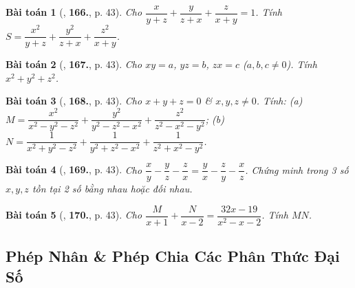 \documentclass{article}
\numberwithin{equation}{section}
\newtheorem{baitoan}{Bài toán}
\begin{document}
\begin{baitoan}[\cite{Tuyen_Toan_8}, \textbf{166.}, p. 43]
	Cho $\dfrac{x}{y + z} + \dfrac{y}{z + x} + \dfrac{z}{x + y} = 1$. Tính $S = \dfrac{x^2}{y + z} + \dfrac{y^2}{z + x} + \dfrac{z^2}{x + y}$.
\end{baitoan}

\begin{baitoan}[\cite{Tuyen_Toan_8}, \textbf{167.}, p. 43]
	Cho $xy = a$, $yz = b$, $zx = c$ ($a,b,c\ne0$). Tính $x^2 + y^2 + z^2$.
\end{baitoan}

\begin{baitoan}[\cite{Tuyen_Toan_8}, \textbf{168.}, p. 43]
	Cho $x + y + z = 0$ \& $x,y,z\ne 0$. Tính: (a) $M = \dfrac{x^2}{x^2 - y^2 - z^2} + \dfrac{y^2}{y^2 - z^2 - x^2} + \dfrac{z^2}{z^2 - x^2 - y^2}$; (b) $N = \dfrac{1}{x^2 + y^2 - z^2} + \dfrac{1}{y^2 + z^2 - x^2} + \dfrac{1}{z^2 + x^2 - y^2}$.
\end{baitoan}

\begin{baitoan}[\cite{Tuyen_Toan_8}, \textbf{169.}, p. 43]
	Cho $\dfrac{x}{y} - \dfrac{y}{z} - \dfrac{z}{x} = \dfrac{y}{x} - \dfrac{z}{y} - \dfrac{x}{z}$. Chứng minh trong 3 số $x,y,z$ tồn tại 2 số bằng nhau hoặc đối nhau.
\end{baitoan}

\begin{baitoan}[\cite{Tuyen_Toan_8}, \textbf{170.}, p. 43]
	Cho $\dfrac{M}{x + 1} + \dfrac{N}{x - 2} = \dfrac{32x - 19}{x^2 - x - 2}$. Tính $MN$.
\end{baitoan}

\subsection{Phép Nhân \& Phép Chia Các Phân Thức Đại Số}


\printbibliography[heading=bibintoc]
	
\end{document}
